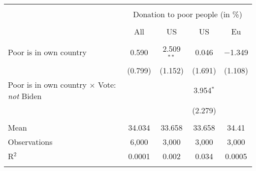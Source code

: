 
\begin{tabular}{@{\extracolsep{5pt}}lcccc} 
\\[-1.8ex]\hline 
\hline \\[-1.8ex] 
 & \multicolumn{4}{c}{Donation to poor people (in \%)} \\ 
\cline{2-5} 
\\[-1.8ex] & All & US & US & Eu \\ 
\hline \\[-1.8ex] 
 Poor is in own country & 0.590 & 2.509$^{**}$ & 0.046 & $-$1.349 \\ 
  & (0.799) & (1.152) & (1.691) & (1.108) \\ 
  Poor is in own country $\times$ Vote: \textit{not} Biden &  &  & 3.954$^{*}$ &  \\ 
  &  &  & (2.279) &  \\ 
 \hline \\[-1.8ex] 
Mean & 34.034 & 33.658 & 33.658 & 34.41 \\ 
Observations & 6,000 & 3,000 & 3,000 & 3,000 \\ 
R$^{2}$ & 0.0001 & 0.002 & 0.034 & 0.0005 \\ 
\hline 
\hline \\[-1.8ex] 
\end{tabular} 